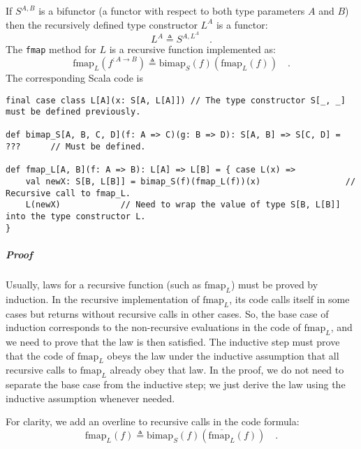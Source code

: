 If $S^{A,B}$ is a bifunctor (a functor with respect to both type
parameters $A$ and $B$) then the recursively defined type constructor
$L^{A}$ is a functor:
\[
L^{A}\triangleq S^{A,L^{A}}\quad.
\]
The \lstinline!fmap! method for $L$ is a recursive function implemented
as:
\begin{equation}
\text{fmap}_{L}(f^{:A\rightarrow B})\triangleq\text{bimap}_{S}(f)(\text{fmap}_{L}(f))\quad.\label{eq:def-recursive-functor-fmap}
\end{equation}
The corresponding Scala code is
\begin{lstlisting}
final case class L[A](x: S[A, L[A]]) // The type constructor S[_, _] must be defined previously.

def bimap_S[A, B, C, D](f: A => C)(g: B => D): S[A, B] => S[C, D] = ???      // Must be defined.

def fmap_L[A, B](f: A => B): L[A] => L[B] = { case L(x) =>
    val newX: S[B, L[B]] = bimap_S(f)(fmap_L(f))(x)                 // Recursive call to fmap_L.
    L(newX)            // Need to wrap the value of type S[B, L[B]] into the type constructor L.
}
\end{lstlisting}


\subparagraph{Proof}

Usually, laws for a recursive
function (such as $\text{fmap}_{L}$) must be proved by induction.
In the recursive implementation of $\text{fmap}_{L}$, its code calls
itself in some cases but returns without recursive calls in other
cases. So, the base case of induction corresponds to the non-recursive
evaluations in the code of $\text{fmap}_{L}$, and we need to prove
that the law is then satisfied. The inductive step must prove that
the code of $\text{fmap}_{L}$ obeys the law under the inductive assumption
that all recursive calls to $\text{fmap}_{L}$ already obey that law.
In the proof, we do not need to separate the base case from the inductive
step; we just derive the law using the inductive assumption whenever
needed.

For clarity, we add an overline to recursive calls in the code formula:
\[
\text{fmap}_{L}(f)\triangleq\text{bimap}_{S}(f)(\overline{\text{fmap}_{L}}(f))\quad.
\]

